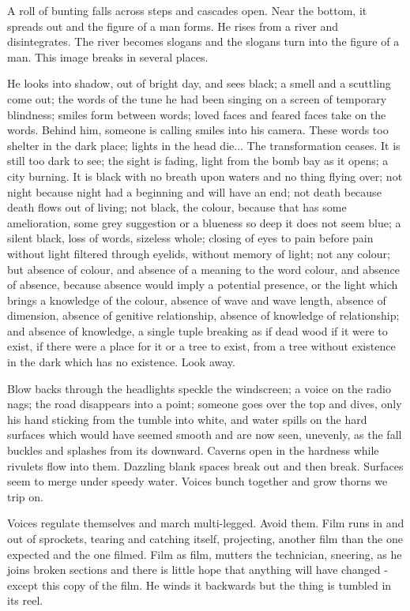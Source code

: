 \documentclass[
]{memoir}
\begin{document}
A roll of bunting falls across steps and cascades open. Near the bottom,
it spreads out and the figure of a man forms. He rises from a river and
disintegrates. The river becomes slogans and the slogans turn into the
figure of a man. This image breaks in several places.

He looks into shadow, out of bright day, and sees black; a smell and a
scuttling come out; the words of the tune he had been singing on a
screen of temporary blindness; smiles form between words; loved faces
and feared faces take on the words. Behind him, someone is calling
smiles into his camera. These words too shelter in the dark place;
lights in the head die... The transformation ceases. It is still too
dark to see; the sight is fading, light from the bomb bay as it opens; a
city burning. It is black with no breath upon waters and no thing flying
over; not night because night had a beginning and will have an end; not
death because death flows out of living; not black, the colour, because
that has some amelioration, some grey suggestion or a blueness so deep
it does not seem blue; a silent black, loss of words, sizeless whole;
closing of eyes to pain before pain without light filtered through
eyelids, without memory of light; not any colour; but absence of colour,
and absence of a meaning to the word colour, and absence of absence,
because absence would imply a potential presence, or the light which
brings a knowledge of the colour, absence of wave and wave length,
absence of dimension, absence of genitive relationship, absence of
knowledge of relationship; and absence of knowledge, a single tuple
breaking as if dead wood if it were to exist, if there were a place for
it or a tree to exist, from a tree without existence in the dark which
has no existence. Look away.

Blow backs through the headlights speckle the windscreen; a voice on the
radio nags; the road disappears into a point; someone goes over the top
and dives, only his hand sticking from the tumble into white, and water
spills on the hard surfaces which would have seemed smooth and are now
seen, unevenly, as the fall buckles and splashes from its downward.
Caverns open in the hardness while rivulets flow into them. Dazzling
blank spaces break out and then break. Surfaces seem to merge under
speedy water. Voices bunch together and grow thorns we trip on.

Voices regulate themselves and march multi-legged. Avoid them. Film runs
in and out of sprockets, tearing and catching itself, projecting,
another film than the one expected and the one filmed. Film as film,
mutters the technician, sneering, as he joins broken sections and there
is little hope that anything will have changed - except this copy of the
film. He winds it backwards but the thing is tumbled in its reel.
\end{document}
